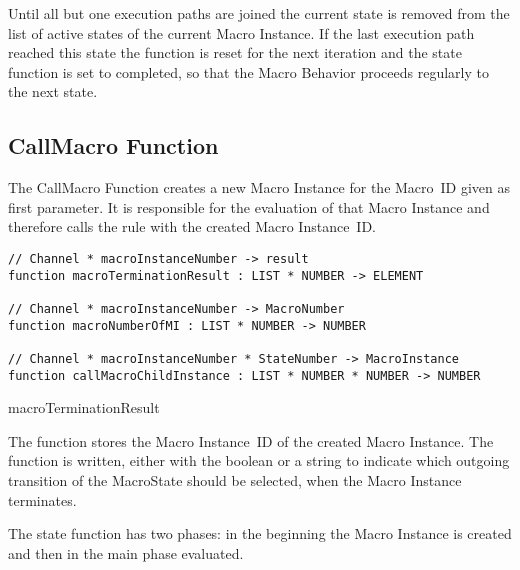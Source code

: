 Until all but one execution paths are joined the current state is removed
from the list of active states of the current Macro Instance. If the last
execution path reached this state the  function is reset for the next
iteration and the state function is set to completed, so that the Macro Behavior proceeds
regularly to the next state.





\subsection{CallMacro Function}


The CallMacro Function creates a new Macro Instance for the Macro~ID given as
first parameter. It is responsible for the evaluation of that Macro Instance
and therefore calls the  rule with the created Macro
Instance~ID.


\begin{listing}[H]
\begin{verbatim}
// Channel * macroInstanceNumber -> result
function macroTerminationResult : LIST * NUMBER -> ELEMENT

// Channel * macroInstanceNumber -> MacroNumber
function macroNumberOfMI : LIST * NUMBER -> NUMBER

// Channel * macroInstanceNumber * StateNumber -> MacroInstance
function callMacroChildInstance : LIST * NUMBER * NUMBER -> NUMBER
\end{verbatim}
\caption{macroTerminationResult}
\label{lst:shortasm:macroTerminationResult}
\end{listing}



The  function stores the Macro Instance~ID
of the created Macro Instance. The 
function is written, either with the boolean  or a string to
indicate which outgoing transition of the MacroState should be selected, when the
Macro Instance terminates.

The state function has two phases: in the beginning the Macro Instance is created
and then in the main phase evaluated.



